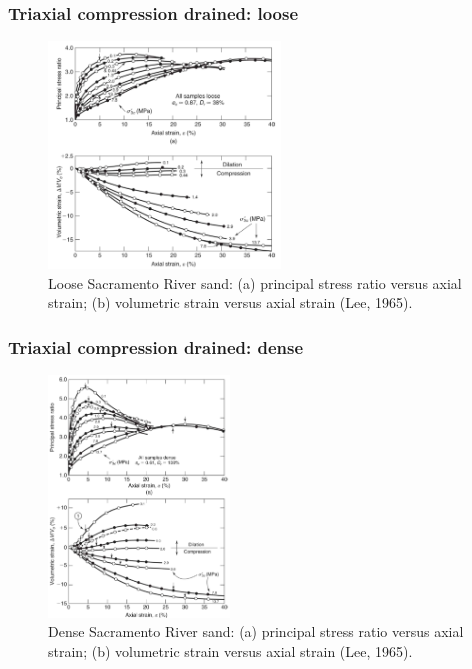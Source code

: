 \documentclass[notes]{beamer}
\begin{document}
\begin{frame}
	\frametitle{Triaxial compression drained: loose}
	\begin{figure}
		\includegraphics[width=0.55\textwidth]{figs/tx-drained-loose.png}
		\caption*{Loose Sacramento River sand: (a) principal stress ratio versus
			axial strain; (b) volumetric strain versus axial strain (Lee, 1965).}
	\end{figure}
\end{frame}

\begin{frame}
	\frametitle{Triaxial compression drained: dense}
	\begin{figure}
		\includegraphics[width=0.43\textwidth]{figs/tx-drained-dense.png}
		\caption*{Dense Sacramento River sand: (a) principal stress ratio versus
			axial strain; (b) volumetric strain versus axial strain (Lee, 1965).}
	\end{figure}
\end{frame}
\end{document}
